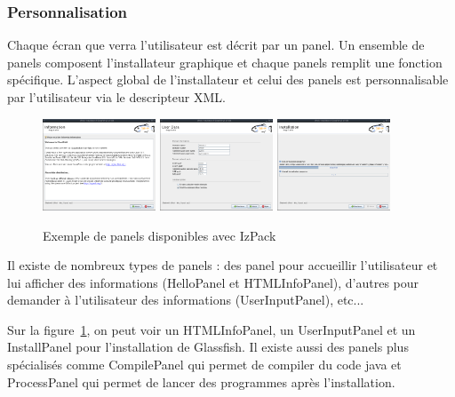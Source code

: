 \subsubsection{Personnalisation}
Chaque écran que verra l'utilisateur est décrit par un panel.
Un ensemble de panels composent l'installateur graphique et chaque panels remplit une fonction spécifique.
L'aspect global de l'installateur et celui des panels est personnalisable par l'utilisateur via le descripteur XML.
\begin{figure}[H]
	\centering
	\includegraphics[width=0.3\textwidth]{../dia/included/install/02.png}
	\includegraphics[width=0.3\textwidth]{../dia/included/install/05.png}
	\includegraphics[width=0.3\textwidth]{../dia/included/install/06.png}
	\caption{Exemple de panels disponibles avec IzPack}
	\label{fig:panelGlass}
\end{figure}
Il existe de nombreux types de panels : des panel pour accueillir l'utilisateur et lui afficher des informations (HelloPanel et HTMLInfoPanel), d'autres pour demander à l'utilisateur des informations (UserInputPanel), etc...

Sur la figure~\ref{fig:panelGlass}, on peut voir un HTMLInfoPanel, un UserInputPanel et un InstallPanel pour l'installation de Glassfish.
Il existe aussi des panels plus spécialisés comme CompilePanel qui permet de compiler du code java et ProcessPanel qui permet de lancer des programmes après l'installation.
